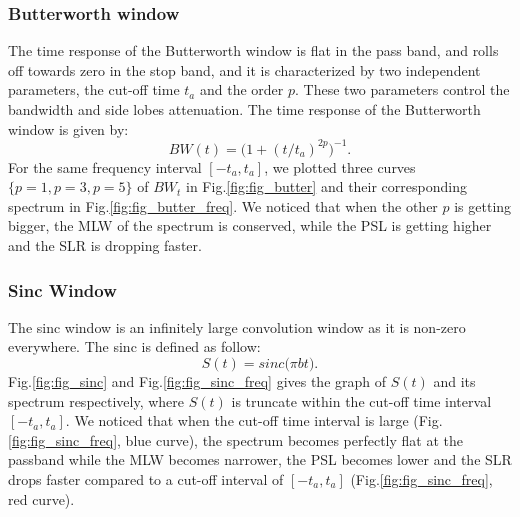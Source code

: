 \documentclass[useAMS,usenatbib]{mn2e}
\begin{document}
\subsubsection{Butterworth window}
The time response of the Butterworth window is flat  in the pass band, and rolls off towards zero in the stop band, and it is 
characterized by two independent parameters, the cut-off time $t_a$ and the order $p$. These two parameters control the 
bandwidth and side lobes  attenuation. The time response of the Butterworth window is given by:
\begin{equation}
BW(t)= \Big(1 + (t/t_a)^{2p}\Big)^{-1}.
\end{equation}
For the same frequency interval $[-t_a,t_a]$, we plotted  three curves $\{p=1, p=3, p=5\}$ of $BW_{t}$ in Fig.\ref{fig:fig_butter} and 
their corresponding spectrum in Fig.\ref{fig:fig_butter_freq}.  We noticed that when the other $p$ is getting bigger, the MLW of the 
spectrum is conserved, while the PSL is getting higher and the SLR is dropping  faster.
\subsubsection{Sinc Window}
The sinc window  is an infinitely large convolution window as it is non-zero everywhere. The sinc is defined as follow:
\begin{equation}
S(t)= sinc\big(\pi b t\big).
\end{equation}
 Fig.\ref{fig:fig_sinc} and Fig.\ref{fig:fig_sinc_freq} gives the graph of $S(t)$ and its spectrum respectively, where 
$S(t)$ is truncate within the cut-off time interval $[-t_a,t_a]$. We noticed that when the cut-off time interval is large 
(Fig.\ref{fig:fig_sinc_freq}, blue curve), the spectrum becomes perfectly flat at the passband while the MLW becomes narrower,  the PSL 
becomes lower and the SLR drops faster compared to a cut-off interval of $[-t_a,t_a]$ (Fig.\ref{fig:fig_sinc_freq}, red curve). 
\end{document}
